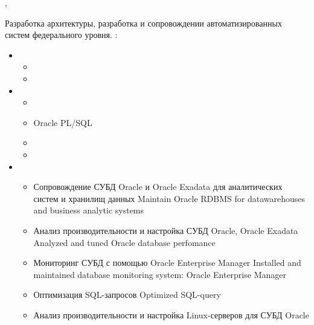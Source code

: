 \documentclass[11pt,a4paper,sans]{moderncv}        %
\begin{document}
{\protect{}}
{\citymoscow, \country}
{}
{
	{Разработка архитектуры, разработка и сопровождении автоматизированных систем федерального уровня.}
	{}\newline{}
	\achievements:
	\begin{itemize}
	\item {}
		\begin{itemize}
		\item {}
		\item {}
		\end{itemize}
	\item {}
		\begin{itemize}
			\item {}
			\item {}
			{Oracle PL/SQL}
			\item {}
			\item {}
		\end{itemize}
	\item {}
		\begin{itemize}
			\item {}
				{Сопровождение СУБД Oracle и Oracle Exadata для аналитических систем и хранилищ данных}
				{Maintain Oracle RDBMS for datawarehouses and business analytic systems}
			\item {}
				{Анализ производительности и настройка СУБД Oracle, Oracle Exadata}
				{Analyzed and tuned Oracle database perfomance}
			\item {}
				{Мониторинг СУБД с помощью Oracle Enterprise Manager}
				{Installed and maintained database monitoring system: Oracle Enterprise Manager}
			\item {}
				{Оптимизация SQL-запросов}
				{Optimized SQL-query}
			\item {}
				{Анализ производительности и настройка Linux-серверов для СУБД Oracle}

\end{itemize}
\end{itemize}}
\end{document}
